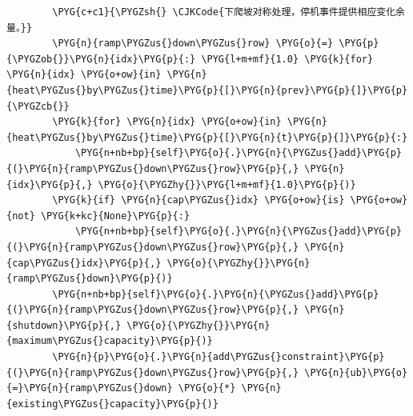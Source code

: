 \begin{Verbatim}
        \PYG{c+c1}{\PYGZsh{} \CJKCode{下爬坡对称处理，停机事件提供相应变化余量。}}
        \PYG{n}{ramp\PYGZus{}down\PYGZus{}row} \PYG{o}{=} \PYG{p}{\PYGZob{}}\PYG{n}{idx}\PYG{p}{:} \PYG{l+m+mf}{1.0} \PYG{k}{for} \PYG{n}{idx} \PYG{o+ow}{in} \PYG{n}{heat\PYGZus{}by\PYGZus{}time}\PYG{p}{[}\PYG{n}{prev}\PYG{p}{]}\PYG{p}{\PYGZcb{}}
        \PYG{k}{for} \PYG{n}{idx} \PYG{o+ow}{in} \PYG{n}{heat\PYGZus{}by\PYGZus{}time}\PYG{p}{[}\PYG{n}{t}\PYG{p}{]}\PYG{p}{:}
            \PYG{n+nb+bp}{self}\PYG{o}{.}\PYG{n}{\PYGZus{}add}\PYG{p}{(}\PYG{n}{ramp\PYGZus{}down\PYGZus{}row}\PYG{p}{,} \PYG{n}{idx}\PYG{p}{,} \PYG{o}{\PYGZhy{}}\PYG{l+m+mf}{1.0}\PYG{p}{)}
        \PYG{k}{if} \PYG{n}{cap\PYGZus{}idx} \PYG{o+ow}{is} \PYG{o+ow}{not} \PYG{k+kc}{None}\PYG{p}{:}
            \PYG{n+nb+bp}{self}\PYG{o}{.}\PYG{n}{\PYGZus{}add}\PYG{p}{(}\PYG{n}{ramp\PYGZus{}down\PYGZus{}row}\PYG{p}{,} \PYG{n}{cap\PYGZus{}idx}\PYG{p}{,} \PYG{o}{\PYGZhy{}}\PYG{n}{ramp\PYGZus{}down}\PYG{p}{)}
        \PYG{n+nb+bp}{self}\PYG{o}{.}\PYG{n}{\PYGZus{}add}\PYG{p}{(}\PYG{n}{ramp\PYGZus{}down\PYGZus{}row}\PYG{p}{,} \PYG{n}{shutdown}\PYG{p}{,} \PYG{o}{\PYGZhy{}}\PYG{n}{maximum\PYGZus{}capacity}\PYG{p}{)}
        \PYG{n}{p}\PYG{o}{.}\PYG{n}{add\PYGZus{}constraint}\PYG{p}{(}\PYG{n}{ramp\PYGZus{}down\PYGZus{}row}\PYG{p}{,} \PYG{n}{ub}\PYG{o}{=}\PYG{n}{ramp\PYGZus{}down} \PYG{o}{*} \PYG{n}{existing\PYGZus{}capacity}\PYG{p}{)}
\end{Verbatim}
